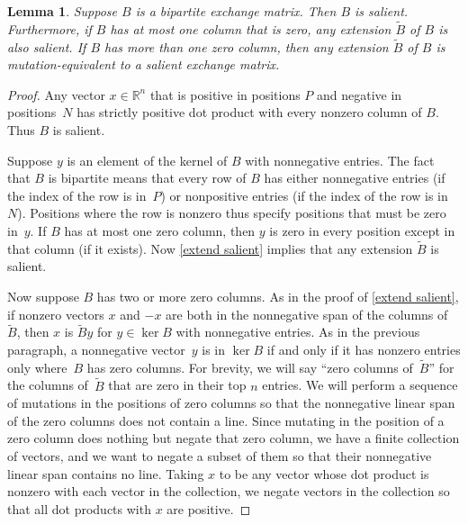\documentclass{amsart}
\newtheorem{lemma}[proposition]{Lemma}
\theoremstyle{definition}
\theoremstyle{remark}
\numberwithin{equation}{section}
\newcommand{\reals}{\mathbb R}
\newcommand{\0}{{\mathbf{0}}}
\newcommand{\tB}{{\tilde{B}}}
\begin{document}
\begin{lemma}\label{bip sal}
Suppose $B$ is a bipartite exchange matrix.
Then $B$ is salient.
Furthermore, if $B$ has at most one column that is zero, any extension $\tB$ of $B$ is also salient.
If $B$ has more than one zero column, then any extension $\tB$ of $B$ is mutation-equivalent to a salient exchange matrix.
\end{lemma}
\begin{proof}
Any vector $x\in\reals^n$ that is positive in positions $P$ and negative in positions~$N$ has strictly positive dot product with every nonzero column of $B$.
Thus $B$ is salient.

Suppose $y$ is an element of the kernel of $B$ with nonnegative entries.
The fact that $B$ is bipartite means that every row of $B$ has either nonnegative entries (if the index of the row is in~$P$) or nonpositive entries (if the index of the row is in~$N$).
Positions where the row is nonzero thus specify positions that must be zero in~$y$.
If $B$ has at most one zero column, then $y$ is zero in every position except in that column (if it exists).
Now \cref{extend salient} implies that any extension $\tB$ is salient.

Now suppose $B$ has two or more zero columns.
As in the proof of \cref{extend salient}, if nonzero vectors $x$ and $-x$ are both in the nonnegative span of the columns of $\tB$, then $x$ is $\tB y$ for $y\in\ker B$ with nonnegative entries.
As in the previous paragraph, a nonnegative vector~$y$ is in $\ker B$ if and only if it has nonzero entries only where~$B$ has zero columns.
For brevity, we will say ``zero columns of~$\tB$'' for the columns of~$\tB$ that are zero in their top $n$ entries. 
We will perform a sequence of mutations in the positions of zero columns so that the nonnegative linear span of the zero columns does not contain a line.
Since mutating in the position of a zero column does nothing but negate that zero column, we have a finite collection of vectors, and we want to negate a subset of them so that their nonnegative linear span contains no line.
Taking $x$ to be any vector whose dot product is nonzero with each vector in the collection, we negate vectors in the collection so that all dot products with $x$ are positive.
\end{proof}
\end{document}
